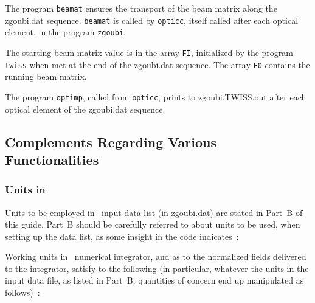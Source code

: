 {\medskip

\noindent The program \texttt{beamat} ensures the transport of the beam matrix along the 
zgoubi.dat sequence. \texttt{beamat}  is called by \texttt{opticc}, 
 itself called after each optical element, in the  program \texttt{zgoubi}. 

\smallskip

\noindent The starting beam matrix value is in the array \texttt{FI},  initialized by the  program \texttt{twiss} 
when met at the end of the zgoubi.dat sequence. 
The array \texttt{F0} contains the running beam matrix. 

\smallskip

\noindent The program  \texttt{optimp}, called from \texttt{opticc},  prints to zgoubi.TWISS.out after each optical element 
of the zgoubi.dat sequence. 





\newpage




\subsection{Complements Regarding Various Functionalities} \label{sec4.6}  


\subsubsection{Units in \zgoubi}  \label{sec4.6.Units} 

\medskip

\noindent Units to be employed in \zgoubi\ input data list (in zgoubi.dat) are stated in Part~B of this guide. Part~B should be 
carefully referred to about units to be used, when setting up the data list, as some insight in the code indicates~:  

\medskip

\noindent Working units in \zgoubi\  numerical integrator, and as to 
the normalized fields delivered to the integrator, satisfy to the  following (in particular, 
whatever the units in the input data file, as listed in Part~B, quantities of concern end up manipulated 
as follows)~: 

}
